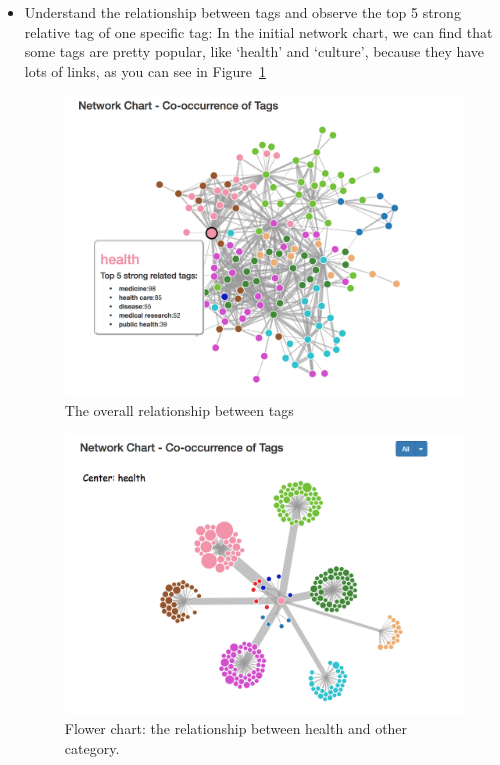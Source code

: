 \documentclass{report}
\numberwithin{figure}{section}
\begin{document}
\begin{itemize}
\item
Understand the relationship between tags and observe the top 5 strong relative tag of one specific tag:
\newline
\quad In the initial network chart, we can find that some tags are pretty popular, like `health' and `culture', because they have lots of links, as you can see in Figure~\ref{fig:health}

\begin{figure}
\begin{center}
\includegraphics[scale=0.6]{health}
\caption{The overall relationship between tags}
\label{fig:health}
\end{center}
\end{figure} 

\begin{figure}
\begin{center}
\includegraphics[scale=0.6]{healthflower}
\caption{Flower chart: the relationship between health and other category.}
\label{fig:healthflower}
\end{center}
\end{figure} 


\end{itemize}
\end{document}
